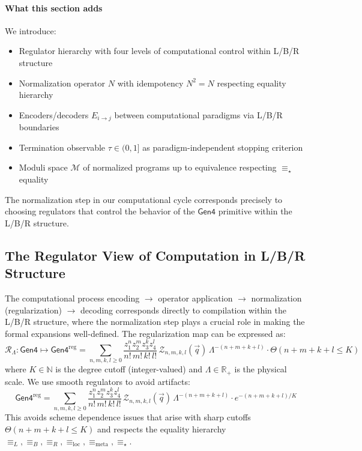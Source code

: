\paragraph{What this section adds}
We introduce:
\begin{itemize}
\item Regulator hierarchy with four levels of computational control within L/B/R structure
\item Normalization operator $N$ with idempotency $N^2 = N$ respecting equality hierarchy
\item Encoders/decoders $E_{i\to j}$ between computational paradigms via L/B/R boundaries
\item Termination observable $\tau \in (0,1]$ as paradigm-independent stopping criterion
\item Moduli space $\mathcal{M}$ of normalized programs up to equivalence respecting $\equiv_\star$ equality
\end{itemize}

The normalization step in our computational cycle corresponds precisely to choosing regulators that control the behavior of the $\mathsf{Gen4}$ primitive within the L/B/R structure.

\subsection{The Regulator View of Computation in L/B/R Structure}

The computational process encoding $\to$ operator application $\to$ normalization (regularization) $\to$ decoding corresponds directly to compilation within the L/B/R structure, where the normalization step plays a crucial role in making the formal expansions well-defined. The regularization map can be expressed as:
\[
\mathcal{R}_\Lambda: \mathsf{Gen4} \mapsto \mathsf{Gen4}^{\text{reg}} = \sum_{n,m,k,l\ge0}\frac{z_1^n z_2^m z_3^k z_4^l}{n!\,m!\,k!\,l!}\,\mathcal{Z}_{n,m,k,l}(\vec{q})\,\Lambda^{-(n+m+k+l)} \cdot \Theta(n+m+k+l \leq K)
\]
where $K \in \mathbb{N}$ is the degree cutoff (integer-valued) and $\Lambda \in \mathbb{R}_+$ is the physical scale. We use smooth regulators to avoid artifacts:
\[
\mathsf{Gen4}^{\text{reg}} = \sum_{n,m,k,l\ge0}\frac{z_1^n z_2^m z_3^k z_4^l}{n!\,m!\,k!\,l!}\,\mathcal{Z}_{n,m,k,l}(\vec{q})\,\Lambda^{-(n+m+k+l)} \cdot e^{-(n+m+k+l)/K}
\]
This avoids scheme dependence issues that arise with sharp cutoffs $\Theta(n+m+k+l \leq K)$ and respects the equality hierarchy $\equiv_L, \equiv_B, \equiv_R, \equiv_{\text{loc}}, \equiv_{\text{meta}}, \equiv_\star$.


